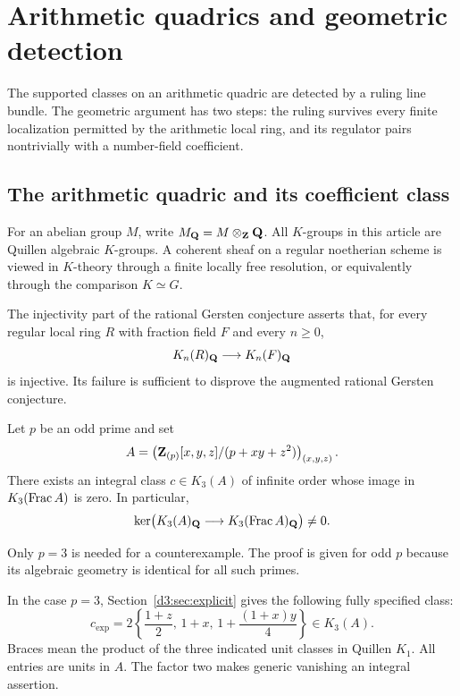 \section{Arithmetic quadrics and geometric detection}\label{d3:sec:geometry}
The supported classes on an arithmetic quadric are detected by a ruling
line bundle. The geometric argument has two steps: the ruling survives
every finite localization permitted by the arithmetic local ring, and
its regulator pairs nontrivially with a number-field coefficient.

\subsection{The arithmetic quadric and its coefficient class}

For an abelian group $M$, write $M_{\mathbf Q}=M\otimes_{\mathbf Z}\mathbf Q$. All $K$-groups in this article are Quillen algebraic $K$-groups. A coherent sheaf on a regular noetherian scheme is viewed in $K$-theory through a finite locally free resolution, or equivalently through the comparison $K\simeq G$.

The injectivity part of the rational Gersten conjecture asserts that, for every regular local ring $R$ with fraction field $F$ and every $n\geq 0$,
\[
K_n(R)_{\mathbf Q}\longrightarrow K_n(F)_{\mathbf Q}
\]
is injective. Its failure is sufficient to disprove the augmented rational Gersten conjecture.

\begin{theorem}\label{d3:thm:main}
Let $p$ be an odd prime and set
\[
A=\left(\mathbf Z_{(p)}[x,y,z]/(p+xy+z^2)\right)_{(x,y,z)}.
\]
There exists an integral class $c\in K_3(A)$ of infinite order whose image in $K_3(\operatorname{Frac} A)$ is zero. In particular,
\[
\ker\bigl(K_3(A)_{\mathbf Q}\longrightarrow K_3(\operatorname{Frac} A)_{\mathbf Q}\bigr)\neq 0.
\]
\end{theorem}

Only $p=3$ is needed for a counterexample. The proof is given for odd $p$ because its algebraic geometry is identical for all such primes.

In the case $p=3$, Section~\ref{d3:sec:explicit} gives the following fully specified class:
\begin{equation}\label{d3:eq:explicitfront}
\boxed{\quad
c_{\mathrm{exp}}=2\left\{\frac{1+z}{2},\,1+x,\,
1+\frac{(1+x)y}{4}\right\}\in K_3(A).
\quad}
\end{equation}
Braces mean the product of the three indicated unit classes in Quillen $K_1$. All entries are units in $A$. The factor two makes generic vanishing an integral assertion.



